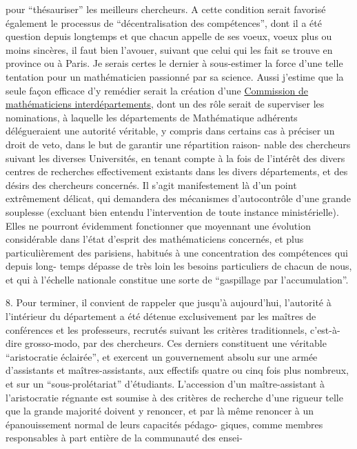
pour ``thésauriser'' les meilleurs chercheurs. A cette condition serait favorisé
également le processus de ``décentralisation des compétences'', dont il a été
question depuis longtemps et que chacun appelle de ses voeux, voeux plus ou
moins sincères, il faut bien l'avouer, suivant que celui qui les fait se trouve
en province ou à Paris. Je serais certes le dernier à sous-estimer la force
d'une telle tentation pour un mathématicien passionné par sa science. Aussi
j'estime que la seule façon efficace d'y remédier serait la création d'une
\uline{Commission de mathématiciens interdépartements}, dont un des rôle serait de
superviser les nominations, à laquelle les départements de Mathématique
adhérents délégueraient une autorité véritable, y compris dans certains cas
à préciser un droit de veto, dans le but de garantir une répartition raison-%
nable des chercheurs suivant les diverses Universités, en tenant compte à la
fois de l'intérêt des divers centres de recherches effectivement existants dans
les divers départements, et des désirs des chercheurs concernés. Il s'agit
manifestement là d'un point extrêmement délicat, qui demandera des mécanismes
d'autocontrôle d'une grande souplesse (excluant bien entendu l'intervention
de toute instance ministérielle). Elles ne pourront évidemment fonctionner
\hfill que moyennant une évolution considérable
dans l'état d'esprit des mathématiciens concernés, et plus particulièrement
des parisiens, habitués à une concentration des compétences qui depuis long-%
temps dépasse de très loin les besoins particuliers de chacun de nous, et qui
à l'échelle nationale constitue une sorte de ``gaspillage par l'accumulation''.

8. Pour terminer, il convient de rappeler que jusqu'à aujourd'hui, l'autorité
à l'intérieur du département a été détenue exclusivement par les maîtres de
conférences et les professeurs, recrutés suivant les critères traditionnels,
c'est-à-dire grosso-modo, par des chercheurs. Ces derniers constituent une
véritable ``aristocratie éclairée'', et exercent un gouvernement absolu sur
une armée d'assistants et maîtres-assistants, aux effectifs quatre ou cinq
fois plus nombreux, et sur un ``sous-prolétariat'' d'étudiants. L'accession
d'un maître-assistant à l'aristocratie régnante est soumise à des critères
de recherche d'une rigueur telle que la grande majorité doivent y renoncer,
et par là même renoncer à un épanouissement normal de leurs capacités pédago-%
giques, comme membres responsables à part entière de la communauté des ensei-%

